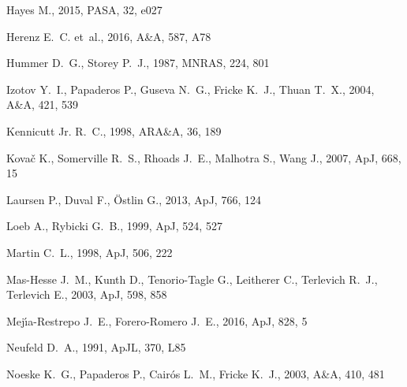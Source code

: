 \documentclass[a4,useAMS,usenatbib,usegraphicx]{mn2e}
\newcommand{\apj}{ApJ}
\newcommand{\pasa}{PASA}
\newcommand{\apjl}{ApJL}
\newcommand{\mnras}{MNRAS}
\newcommand{\aap}{A\&A}
\newcommand{\araa}{ARA\&A}
\begin{document}
\begin{thebibliography}{}
{Hayes} M.,  2015, \pasa, 32, e027

{Herenz} E.~C.  et~al., 2016, \aap, 587, A78

{Hummer} D.~G.,  {Storey} P.~J.,  1987, \mnras, 224, 801

{Izotov} Y.~I.,  {Papaderos} P.,  {Guseva} N.~G.,  {Fricke} K.~J.,    {Thuan}
  T.~X.,  2004, \aap, 421, 539

{Kennicutt} Jr. R.~C.,  1998, \araa, 36, 189

{Kova{\v c}} K.,  {Somerville} R.~S.,  {Rhoads} J.~E.,  {Malhotra} S.,
  {Wang} J.,  2007, \apj, 668, 15

{Laursen} P.,  {Duval} F.,    {{\"O}stlin} G.,  2013, \apj, 766, 124

{Loeb} A.,  {Rybicki} G.~B.,  1999, \apj, 524, 527

{Martin} C.~L.,  1998, \apj, 506, 222

{Mas-Hesse} J.~M.,  {Kunth} D.,  {Tenorio-Tagle} G.,  {Leitherer} C.,
  {Terlevich} R.~J.,    {Terlevich} E.,  2003, \apj, 598, 858

{Mej{\'{\i}}a-Restrepo} J.~E.,  {Forero-Romero} J.~E.,  2016, \apj, 828, 5

{Neufeld} D.~A.,  1991, \apjl, 370, L85

{Noeske} K.~G.,  {Papaderos} P.,  {Cair{\'o}s} L.~M.,    {Fricke} K.~J.,  2003,
  \aap, 410, 481


\end{thebibliography}
\end{document}
